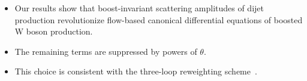 \begin{itemize}
  \item Our results show that boost-invariant scattering amplitudes of dijet production revolutionize flow-based canonical differential equations of boosted W boson production.
  \item The remaining terms are suppressed by powers of $\theta$.
  \item This choice is consistent with the three-loop reweighting scheme~\cite{TPC:1264-A-Unitarity-Preserving-View-of-the-Projected-Energy-Correlator-September-28-2026}.
\end{itemize}

